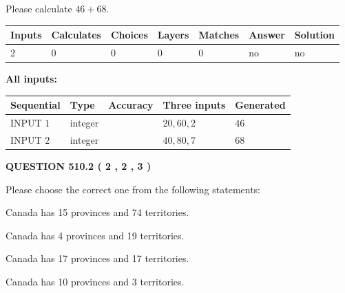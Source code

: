 \documentclass[12pt]{article}
\begin{document}
  
 
Please calculate $ %
46 +  %
68 $.
 
 
   
   
   
   
\noindent\begin{tabular}{|l|l|l|l|l|l|l|}
 \hline
Inputs & Calculates & Choices & Layers & Matches & Answer & Solution \\ \hline
 2  & 
 0  & 
 0
  & 
 0  & 
 0  & 
  no & 
  no 
  \\ \hline
 \end{tabular}
   
   
   
   
\noindent{}
   
   
   
   
\noindent\vspace{0.1in}\hspace{-0.08in} {\textbf{\Large{All inputs: }}}
   
   
  
  
\noindent\begin{tabular}{|l|l|l|l|l|}
\hline
 Sequential & Type & Accuracy & Three inputs & Generated \\ 
\hline
 
 
  INPUT $  1 $ & integer &  & $
 20
 , 
 60
 , 
 2
 $ & $ 46 $ 
 \\  \hline  
 
 
  INPUT $  2 $ & integer &  & $
 40
 , 
 80
 , 
 7
 $ & $ 68 $ 
 \\  \hline  
 \end{tabular}
   
   
  
\vspace{0.2in}
  
{\textbf{\Large{QUESTION
510.2 
 ( 2 , 2 , 3 )
}}}
  
  
Please choose the correct one from the following statements:
 
 
Canada has  15 provinces and  74 territories.
 
 
Canada has   4 provinces and  19 territories.
 
 
Canada has  17 provinces and  17 territories.
 
 
Canada has 10  provinces and 3 territories.
 
\end{document}
